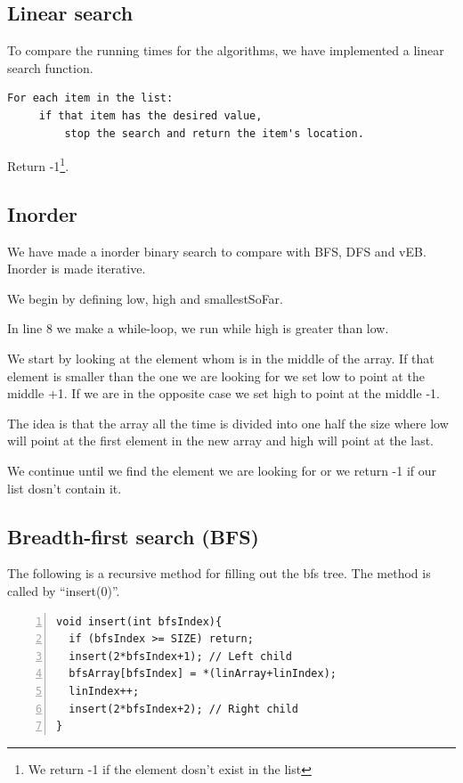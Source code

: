 \subsection{Linear search}
To compare the running times for the algorithms, we have implemented a linear search function.
\begin{verbatim}
For each item in the list:
     if that item has the desired value,
         stop the search and return the item's location.
\end{verbatim}
 Return -1\footnote{We return -1 if the element dosn't exist in the list}.

\subsection{Inorder}

We have made a inorder binary search to compare with BFS, DFS and vEB.
Inorder is made iterative.

We begin by defining low, high and smallestSoFar.

In line 8 we make a while-loop, we run while high is greater than low.

We start by looking at the element whom is in the middle of the array.
If that element is smaller than the one we are looking for we set low to point at the middle +1.
If we are in the opposite case we set high to point at the middle -1.

The idea is that the array all the time is divided into one half the size where low will point at the first element in the new array and high will point at the last.

We continue until we find the element we are looking for or we return -1 if our list dosn't contain it.


\subsection{Breadth-first search (BFS)}


The following is a recursive method for filling out the bfs tree. The method is called by ``insert(0)''.
\begin{lstlisting}[numbers=left]
void insert(int bfsIndex){
  if (bfsIndex >= SIZE) return;
  insert(2*bfsIndex+1); // Left child
  bfsArray[bfsIndex] = *(linArray+linIndex);
  linIndex++;
  insert(2*bfsIndex+2); // Right child
}
\end{lstlisting}



